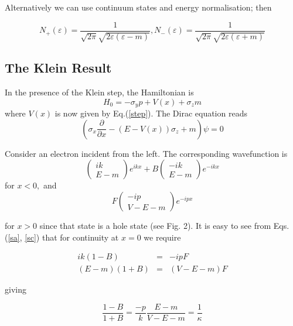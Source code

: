\noindent Alternatively we can use continuum states and energy
normalisation; then

\begin{equation}  \label{en}
N_{+}(\varepsilon )=\frac 1{\sqrt{2\pi }\sqrt{2\varepsilon (\varepsilon -m)}}%
,N_{-}(\varepsilon )=\frac 1{\sqrt{2\pi }\sqrt{2\varepsilon (\varepsilon +m)}%
}
\end{equation}

\subsection{The Klein Result}

\noindent In the presence of the Klein step, the Hamiltonian is 
\[
H_0=-\sigma _yp+V(x)+\sigma _zm
\]
where $V(x)$ is now given by Eq.(\ref{step}). The Dirac equation reads 
\begin{equation}
(\sigma _x\frac \partial {\partial x}-(E-V(x))\sigma _z+m)\psi =0
\label{eqn}
\end{equation}

\noindent Consider an electron incident from the left. The corresponding
wavefunction is 
\begin{equation}
\left( 
\begin{array}{c}
ik \\ 
E-m
\end{array}
\right) e^{ikx}+B\left( 
\begin{array}{c}
-ik \\ 
E-m
\end{array}
\right) e^{-ikx}  \label{sa}
\end{equation}
for $x<0,$ and 
\begin{equation}
F\left( 
\begin{array}{c}
-ip \\ 
V-E-m
\end{array}
\right) e^{-ipx}  \label{sc}
\end{equation}

\noindent for $x>0$ since that state is a hole state (see Fig. 2). It is
easy to see from Eqs. (\ref{sa}, \ref{sc}) that for continuity at $x=0$ we
require

\begin{eqnarray}
ik(1-B) &=&-ipF \\
(E-m)(1+B) &=&(V-E-m)F  \nonumber
\end{eqnarray}

\noindent giving

\[
\frac{1-B}{1+B}=\frac{-p}k\frac{E-m}{V-E-m}=\frac 1\kappa 
\]

